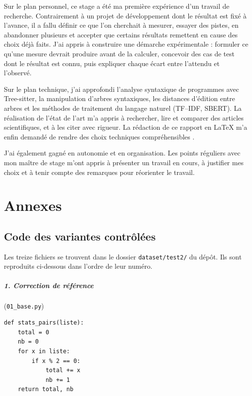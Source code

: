 \documentclass[12pt,a4paper,oneside]{report}
\begin{document}
Sur le plan personnel, ce stage a été ma première expérience d'un travail de
recherche. Contrairement à un projet de développement dont le résultat est
fixé à l'avance, il a fallu définir ce que l'on cherchait à mesurer, essayer
des pistes, en abandonner plusieurs et accepter que certains résultats
remettent en cause des choix déjà faits. J'ai appris à construire une
démarche expérimentale : formuler ce qu'une mesure devrait produire avant
de la calculer, concevoir des cas de test dont le résultat est connu, puis
expliquer chaque écart entre l'attendu et l'observé.

Sur le plan technique, j'ai approfondi l'analyse syntaxique de programmes
avec Tree-sitter, la manipulation d'arbres syntaxiques, les distances
d'édition entre arbres et les méthodes de traitement du langage naturel
(TF--IDF, SBERT). La réalisation de l'état de l'art m'a appris à rechercher,
lire et comparer des articles scientifiques, et à les citer avec rigueur.
La rédaction de ce rapport en \LaTeX{} m'a enfin demandé de rendre des
choix techniques compréhensibles .

J'ai également gagné en autonomie et en organisation. Les points réguliers
avec mon maître de stage m'ont appris à présenter un travail en cours, à
justifier mes choix et à tenir compte des remarques pour réorienter le
travail.

\printbibliography[heading=bibintoc,nottype=online,title={Bibliographie}]
\printbibliography[heading=bibintoc,type=online,title={Webographie}]

\appendix
\chapter{Annexes}
\section{Code des variantes contrôlées}
\label{ann:variantes}

Les treize fichiers se trouvent dans le dossier \texttt{dataset/test2/} du
dépôt. Ils sont reproduits ci-dessous dans l'ordre de leur numéro.

\paragraph{1. Correction de référence} (\texttt{01\_base.py})
\begin{lstlisting}[style=pyncst]
def stats_pairs(liste):
    total = 0
    nb = 0
    for x in liste:
        if x % 2 == 0:
            total += x
            nb += 1
    return total, nb
\end{lstlisting}
\end{document}
